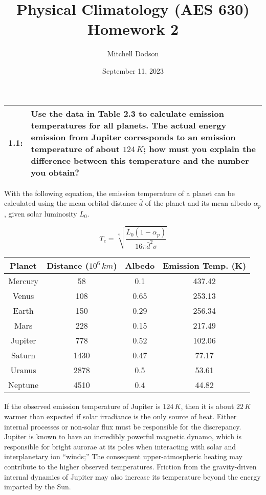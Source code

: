 \documentclass[12pt]{article}
\title{Physical Climatology (AES 630) Homework 2}
\author{Mitchell Dodson}
\date{September 11, 2023}
\newcommand*{\problem}[2]{
    \begin{table}[ht]
    \centering
        \begin{tabular}{ | p{.1\linewidth} p{.9\linewidth} | }
            \hline
            \vspace{.3em}\textbf{\large#1:} & \vspace{.3em}\small{#2}\hspace{.2em}\vspace{.5em} \\ \hline
        \end{tabular}
    \end{table}
}
\begin{document}
\maketitle

\problem{1.1}{Use the data in Table 2.3 to calculate emission temperatures for all planets. The actual energy emission from Jupiter corresponds to an emission temperature of about $124\,\si{K}$; how must you explain the difference between this temperature and the number you obtain?}

With the following equation, the emission temperature of a planet can be calculated using the mean orbital distance $\bar{d}$ of the planet and its mean albedo $\alpha_p$, given solar luminosity $L_0$.

\begin{figure}[h!]
    \begin{equation}\label{emit_temp}
        T_e = \sqrt[4]{\frac{L_0 (1-\alpha_p)}{16\pi \bar{d}^2 \sigma}}
    \end{equation}
\end{figure}

\begin{center}
    \begin{tabular}{c | c c c}
        Planet & Distance ($10^6\,\si{km}$)& Albedo & Emission Temp. (K) \\
         \hline
         Mercury & 58 & 0.1 & 437.42 \\
         Venus & 108 & 0.65 & 253.13 \\
         Earth & 150 & 0.29 & 256.34 \\
         Mars & 228 & 0.15 & 217.49 \\
         Jupiter & 778 & 0.52 & 102.06 \\
         Saturn & 1430 & 0.47 & 77.17 \\
         Uranus & 2878 & 0.5 & 53.61 \\
         Neptune & 4510 & 0.4 & 44.82 \\
    \end{tabular}
\end{center}

If the observed emission temperature of Jupiter is $124\,\si{K}$, then it is about $22\,\si{K}$ warmer than expected if solar irradiance is the only source of heat. Either internal processes or non-solar flux must be responsible for the discrepancy. Jupiter is known to have an incredibly powerful magnetic dynamo, which is responsible for bright aurorae at its poles when interacting with solar and interplanetary ion ``winds;'' The consequent upper-atmospheric heating may contribute to the higher observed temperatures. Friction from the gravity-driven internal dynamics of Jupiter may also increase its temperature beyond the energy imparted by the Sun.
\end{document}
